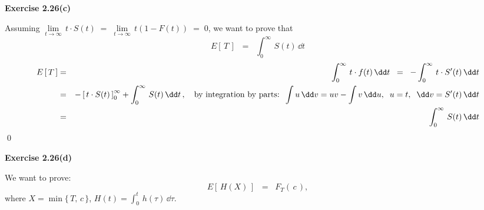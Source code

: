 \vskip 1.0cm
\noindent
\textbf{Exercise 2.26(c)}

\noindent
Assuming
$\underset{t\rightarrow\infty}{\lim}\,t\cdot S(t)
\;=\; \underset{t\rightarrow\infty}{\lim}\,t\left(1 - F(t)\right)
\;=\; 0$,
we want to prove that
\begin{equation*}
E\left[\,T\,\right]
\;\;=\;\;
\int^{\infty}_{0}\,S(t)\,\dd t
\end{equation*}
\proof
\begin{eqnarray*}
E\left[\,T\,\right]
&=& \int^{\infty}_{0}\,t \cdot f(t)\,\dd t
\;\;=\;\; - \int^{\infty}_{0}\, t \cdot S^{\prime}(t) \,\dd t \\
&=& -\left[\,t \cdot S(t)\,\right]_{0}^{\infty} + \int^{\infty}_{0}\,S(t)\,\dd t\,,
\quad\textnormal{by integration by parts:}\;\;
\int u\,\dd v = uv - \int v\,\dd u,\;\; u = t,\;\; \dd v = S^{\prime}(t)\,\dd t \\
&=& \int^{\infty}_{0}\,S(t)\,\dd t
\end{eqnarray*}
\qed

\vskip 1.0cm
\noindent
\textbf{Exercise 2.26(d)}

\vskip 0.5cm
\noindent
We want to prove:
\begin{equation*}
E\left[\,H(X)\,\right] \;\; = \;\; F_{T}(\,c\,),
\end{equation*}
where $X = \min\{\,T,\,c\,\}$, $H(t) = \int^{t}_{0}\,h(\tau)\,\dd\tau$.

